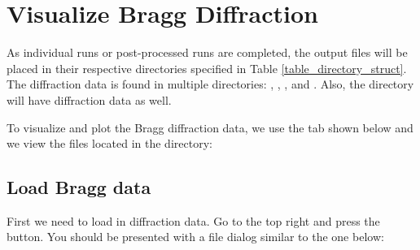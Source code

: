 \section{Visualize Bragg Diffraction}

As individual runs or post-processed runs are completed, the output files will be placed in their respective directories specified in Table \ref{table_directory_struct}. The diffraction data is found in multiple directories: , , , and . Also, the \iptsPrint{} directory will have diffraction data as well. 

To visualize and plot the Bragg diffraction data, we use the  tab shown below and we view the files located in the  directory: 

\noindent{}

\subsection{Load Bragg data}

First we need to load in diffraction data. Go to the top right and press the  button. You should be presented with a file dialog similar to the one below:

\noindent{}

